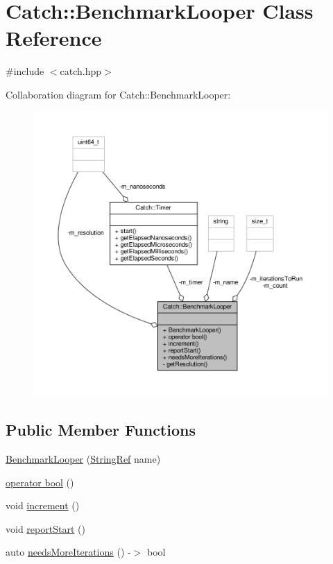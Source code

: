 \hypertarget{class_catch_1_1_benchmark_looper}{\section{Catch\-:\-:Benchmark\-Looper Class Reference}
\label{class_catch_1_1_benchmark_looper}
}


{\ttfamily \#include $<$catch.\-hpp$>$}



Collaboration diagram for Catch\-:\-:Benchmark\-Looper\-:
\nopagebreak
\begin{figure}[H]
\begin{center}
\leavevmode
\includegraphics[width=350pt]{class_catch_1_1_benchmark_looper__coll__graph}
\end{center}
\end{figure}
\subsection*{Public Member Functions}
\begin{DoxyCompactItemize}
\item 
\hyperlink{class_catch_1_1_benchmark_looper_ab9ba6397306a70082f39e63a8a71bde6}{Benchmark\-Looper} (\hyperlink{class_catch_1_1_string_ref}{String\-Ref} name)
\item 
\hyperlink{class_catch_1_1_benchmark_looper_a54da41bada9da038dc05faf41d746765}{operator bool} ()
\item 
void \hyperlink{class_catch_1_1_benchmark_looper_a210552aff5b19408637444d4bb35d59c}{increment} ()
\item 
void \hyperlink{class_catch_1_1_benchmark_looper_a0697d1b266112b110edf2025b82c4e77}{report\-Start} ()
\item 
auto \hyperlink{class_catch_1_1_benchmark_looper_a97bd944521f519b1593a5d1d2f9998fa}{needs\-More\-Iterations} () -\/$>$ bool
\end{DoxyCompactItemize}
